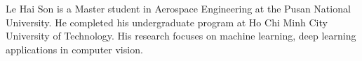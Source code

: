 \documentclass[journal]{IEEEtran}
\begin{document}
\begin{IEEEbiography}{Le Hai Son}
is a Master student in Aerospace Engineering at the Pusan National University. He completed his undergraduate program at Ho Chi Minh City University of Technology. His research focuses on machine learning, deep learning applications in computer vision.
\end{IEEEbiography}










\end{document}
